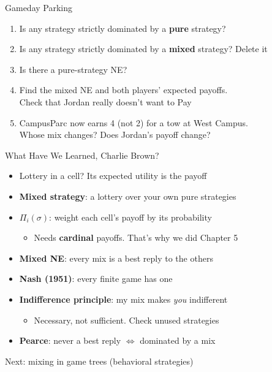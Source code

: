 \begin{frame}{Gameday Parking}
\begin{enumerate}
    \item Is any strategy strictly dominated by a \textbf{pure} strategy? \vspace{0.2in}
    \item Is any strategy strictly dominated by a \textbf{mixed} strategy? Delete it \vspace{0.3in}
    \item Is there a pure-strategy NE? \vspace{0.2in}
    \item Find the mixed NE and both players' expected payoffs. \\
      Check that Jordan really doesn't want to Pay \vspace{0.55in}
    \item CampusParc now earns 4 (not 2) for a tow at West Campus.\\
      Whose mix changes? Does Jordan's payoff change? \vspace{0.3in}
\end{enumerate}
\end{frame}

\begin{frame}{What Have We Learned, Charlie Brown?}
\begin{itemize}
    \item Lottery in a cell? Its expected utility is the payoff
    \item \textbf{Mixed strategy}: a lottery over your own pure strategies
    \item $\Pi_i(\sigma)$: weight each cell's payoff by its probability
    \begin{itemize}
        \item Needs \textbf{cardinal} payoffs. That's why we did Chapter 5
    \end{itemize}
    \item \textbf{Mixed NE}: every mix is a best reply to the others
    \item \textbf{Nash (1951)}: every finite game has one
    \item \textbf{Indifference principle}: my mix makes \textit{you} indifferent
    \begin{itemize}
        \item Necessary, not sufficient. Check unused strategies
    \end{itemize}
    \item \textbf{Pearce}: never a best reply $\iff$ dominated by a mix
\end{itemize}
\vfill
Next: mixing in game trees (behavioral strategies)
\vspace{-0.4in}
\end{frame}

